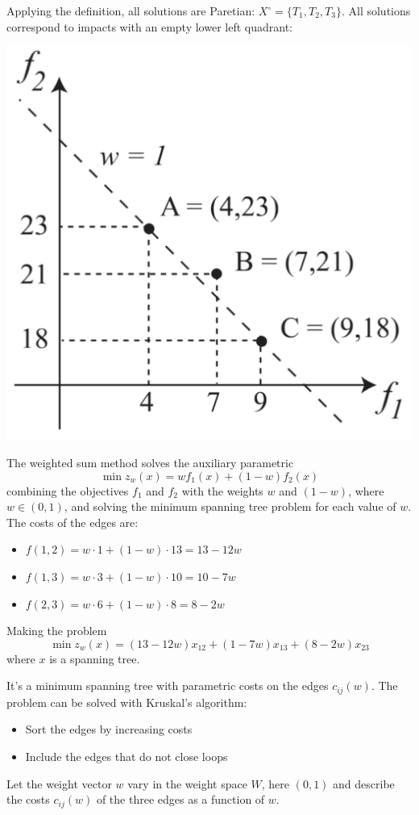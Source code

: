 Applying the definition, all solutions are Paretian: $X^\circ = \{T_1, T_2, T_3\}$. All solutions correspond to impacts with an empty lower left quadrant:
\begin{center}
	\includegraphics[width=0.4\columnwidth]{img/mcp/paretian/combex}
\end{center}

The weighted sum method solves the auxiliary parametric 
$$ \min z_w (x) = w f_1 (x) + (1 - w) f_2 (x) $$
combining the objectives $f_1$ and $f_2$ with the weights $w$ and $(1-w)$, where $w \in (0,1)$, and solving the minimum spanning tree problem for each value of $w$. The costs of the edges are:
\begin{itemize}
	\item $f(1,2) = w \cdot 1 + (1 - w) \cdot 13 = 13 - 12 w$
	
	\item $f(1,3) = w \cdot 3 + (1 - w) \cdot 10 = 10 - 7 w$
	
	\item $f(2,3) = w \cdot 6 + (1 - w) \cdot 8 = 8 - 2 w$
\end{itemize}

Making the problem
$$ \min z_w (x) = (13 - 12w) x_{12} + (1-7w)x_{13} + (8-2w)x_{23} $$
where $x$ is a spanning tree.

It's a minimum spanning tree with parametric costs on the edges $c_{ij} (w)$. The problem can be solved with Kruskal's algorithm: 
\begin{itemize}
	\item Sort the edges by increasing costs
	
	\item Include the edges that do not close loops
\end{itemize}

Let the weight vector $w$ vary in the weight space $W$, here $(0,1)$ and describe the costs $c_{ij} (w)$ of the three edges as a function of $w$.


